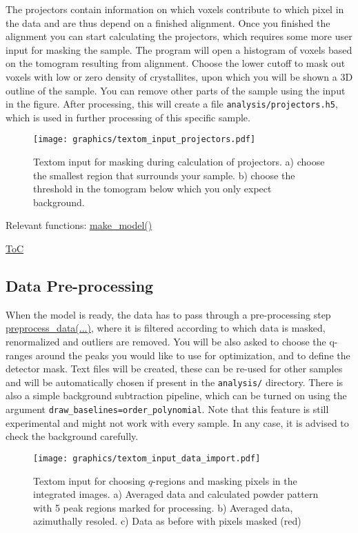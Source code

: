 The projectors contain information on which voxels contribute to which pixel in the data and
are thus depend on a finished alignment. Once you finished the alignment you can start calculating the projectors,
which requires some more user input for masking the sample. The program will open a histogram of voxels based on the
tomogram resulting from alignment. Choose the lower cutoff to mask out voxels with low or zero density of crystallites,
upon which you will be shown a 3D outline of the sample.
You can remove other parts of the sample using the input in the figure.
After processing, this will create a file \texttt{analysis/projectors.h5}, which is used in further processing of this specific sample.

\begin{figure}[h!]
    \texttt{[image: graphics/textom\_input\_projectors.pdf]}
    \centering
    \caption{Textom input for masking during calculation of projectors. 
        a) choose the smallest region that surrounds your sample.
        b) choose the threshold in the tomogram below which you only expect background.
        }
\end{figure}

Relevant functions:
\hyperref[fun:makemodel]{make\_model()}

\begin{flushright}
    \hyperref[toc]{ToC}
\end{flushright}

\subsection{Data Pre-processing}

When the model is ready, the data has to pass through a pre-processing step \hyperref[fun:preprocessdata]{preprocess\_data(...)}, 
where it is filtered according to
which data is masked, renormalized and outliers are removed. You will be also asked to choose the q-ranges
around the peaks you would like to use for optimization, and to define the detector mask.
Text files will be created, these can be re-used for other samples and will be automatically chosen if present
in the \texttt{analysis/} directory.
There is also a simple background subtraction pipeline, which can be turned on using the argument \texttt{draw\_baselines=order\_polynomial}. 
Note that this feature is still experimental and might not work with every sample. 
In any case, it is advised to check the background carefully.

\begin{figure}[h!]
    \texttt{[image: graphics/textom\_input\_data\_import.pdf]}
    \centering
    \caption{Textom input for choosing $q$-regions and masking pixels in the integrated images.
        a) Averaged data and calculated powder pattern with 5 peak regions marked for processing.
        b) Averaged data, azimuthally resoled. c) Data as before with pixels masked (red)
        }
\end{figure}

